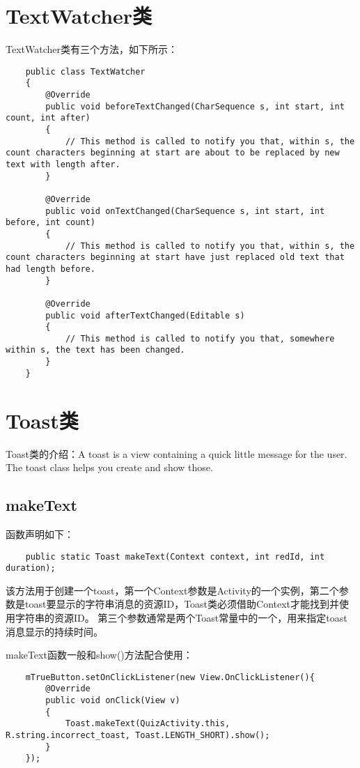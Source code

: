 \documentclass[a4paper,left=2.5cm,right=2.5cm,11pt]{article}
\begin{document}
\section{TextWatcher类}
	TextWatcher类有三个方法，如下所示：
	\begin{lstlisting}
	public class TextWatcher
	{
		@Override
		public void beforeTextChanged(CharSequence s, int start, int count, int after)
		{
			// This method is called to notify you that, within s, the count characters beginning at start are about to be replaced by new text with length after.
		}

		@Override
		public void onTextChanged(CharSequence s, int start, int before, int count)
		{
			// This method is called to notify you that, within s, the count characters beginning at start have just replaced old text that had length before.
		}

		@Override
		public void afterTextChanged(Editable s)
		{
			// This method is called to notify you that, somewhere within s, the text has been changed.
		}
	}
	\end{lstlisting}


\section{Toast类}
	Toast类的介绍：A toast is a view containing a quick little message for the user. The toast class helps you create and show those.

\subsection{makeText}
	函数声明如下：
	\begin{lstlisting}
	public static Toast makeText(Context context, int redId, int duration);
	\end{lstlisting}

	该方法用于创建一个toast，第一个Context参数是Activity的一个实例，第二个参数是toast要显示的字符串消息的资源ID，Toast类必须借助Context才能找到并使用字符串的资源ID。
	第三个参数通常是两个Toast常量中的一个，用来指定toast消息显示的持续时间。\par

	makeText函数一般和show()方法配合使用：
	\begin{lstlisting}
	mTrueButton.setOnClickListener(new View.OnClickListener(){
		@Override
		public void onClick(View v)
		{
			Toast.makeText(QuizActivity.this, R.string.incorrect_toast, Toast.LENGTH_SHORT).show();
		}
	});
	\end{lstlisting}
\end{document}
